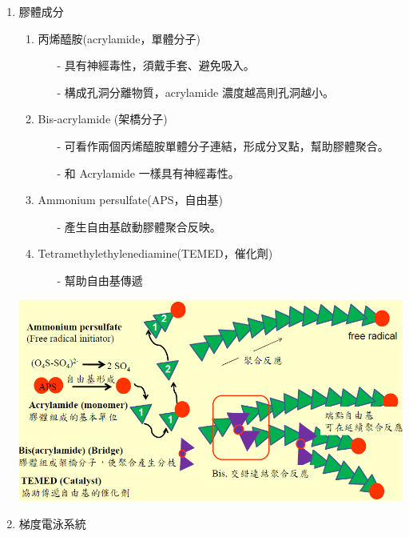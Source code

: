 \begin{enumerate}
  \item 膠體成分
  \begin{enumerate}[label=\alph*.]
    \item 丙烯醯胺(acrylamide，單體分子)
    \begin{itemize}[]
      \item[-] 具有神經毒性，須戴手套、避免吸入。
      \item[-]  構成孔洞分離物質，acrylamide 濃度越高則孔洞越小。
    \end{itemize}

    \item Bis-acrylamide (架橋分子)
    \begin{itemize}[]
      \item[-] 可看作兩個丙烯醯胺單體分子連結，形成分叉點，幫助膠體聚合。
      \item[-] 和 Acrylamide 一樣具有神經毒性。
    \end{itemize}
    \item Ammonium persulfate(APS，自由基)
    \begin{itemize}[]
      \item[-] 產生自由基啟動膠體聚合反映。
    \end{itemize}
    \item Tetramethylethylenediamine(TEMED，催化劑)
    \begin{itemize}[]
      \item[-] 幫助自由基傳遞 
    \end{itemize}
  \end{enumerate}

  \begin{center}
    \includegraphics[width=.7\textwidth]{paste_src/2023-11-13-16-17-57.png}
  \end{center}

  \item 梯度電泳系統
  







\end{enumerate}
